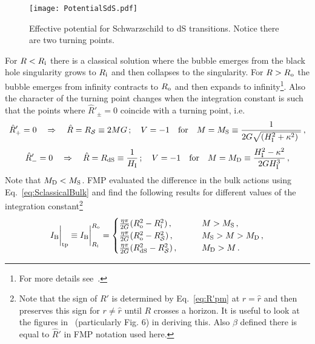 \documentclass[11pt,a4paper]{article}
\begin{document}
\begin{figure}[h!] 
\begin{center} 
\texttt{[image: PotentialSdS.pdf]} 
\caption{\footnotesize{Effective potential for Schwarzschild to dS transitions. Notice there are two turning points. \label{fig:PotentialSdS}}}
\end{center} 
\end{figure}
For $R<R_{{\rm i}}$ there is a classical solution where the bubble
emerges from the black hole singularity grows to $R_{{\rm i}}$ and then collapses to the singularity. For $R>R_{{\rm o}}$ the bubble emerges from infinity contracts to $R_{{\rm o}}$ and then expands to infinity\footnote{For more details see~\cite{Blau:1986cw}.}.
Also the character of the turning point changes when the integration
constant is such that the points where $\hat{R}'_{\pm}=0$ coincide
with a turning point, i.e.
\begin{equation}
\hat{R}'_{+} = 0 \quad \Rightarrow \quad \hat{R}=R_{\mathcal S}\equiv 2MG \,; \quad V  = -1\quad{\rm
for\quad}M= M_{\rm S}\equiv\frac{1}{2G\sqrt{(H_{{\rm
I}}^{2}+\kappa^{2})\ }}\,,\label{eq:Ms}
\end{equation}
\begin{equation}
\hat{R}'_{-} = 0 \quad \Rightarrow \quad \hat{R} = R_{\rm dS}\equiv\frac{1}{H_{{\rm
I}}} \,; \quad V = -1 \quad{\rm for\quad} M =M_{\rm D}\equiv \frac{H_{{\rm
I}}^{2}-\kappa^{2}}{2GH_{{\rm I}}^{3}}\,,
\end{equation}
Note that $M_{\rm D} < M_{\rm S}$. FMP evaluated the difference in the bulk actions using Eq.~\eqref{eq:SclassicalBulk} and find the following results for different values of the integration constant\footnote{Note that the sign of $R'$ is determined by Eq.~\eqref{eq:R'pm} at $r=\hat{r}$ and then preserves this sign for $r\ne\hat{r}$ until $R$ crosses a horizon. It is useful to look at the figures  in~\cite{Blau:1986cw} (particularly Fig. 6) in deriving this. Also $\beta$ defined there is equal to $\hat{R}'$ in FMP notation used here.}
\begin{eqnarray}
I_{{\rm B}}\bigg|_{\rm tp} \equiv I_{{\rm B}}\bigg|_{R_{{\rm i}}}^{R_{\rm o}} =\begin{cases}
\frac{\eta\pi}{2G}(R_{\rm o}^{2}-R_{{\rm
i}}^{2})\,, \qquad & M > M_{\rm S} \,,\label{eq:SB1}\\
\frac{\eta\pi}{2G}(R_{\rm o}^{2}-R_{\mathcal S}^{2})\,, \qquad & M_{\rm S} > M > M_{\rm D} \,,\label{eq:SB2}\\
\frac{\eta\pi}{2G}(R_{\rm dS}^{2}-R_{\mathcal S}^{2})\,, \qquad & M_{\rm D} > M \,.\label{eq:SB3}
 \end{cases}
\end{eqnarray}
\end{document}
